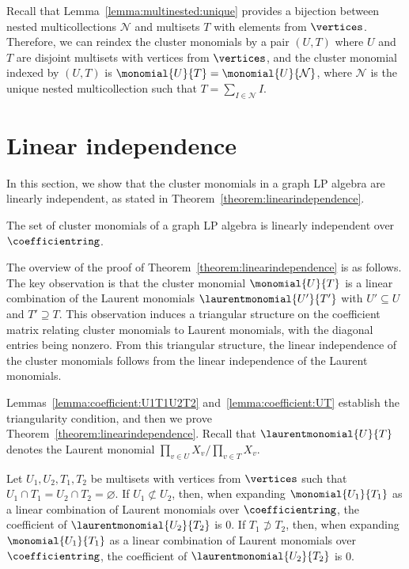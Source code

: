 Recall that Lemma~\ref{lemma:multinested:unique} provides a bijection between nested multicollections \(\mathcal{N}\) and multisets \(T\) with elements from \(\vertices\).
Therefore, we can reindex the cluster monomials by a pair \((U, T)\) where \(U\) and \(T\) are disjoint multisets with vertices from \(\vertices\),
and the cluster monomial indexed by \((U, T)\) is 
\( \monomial{U}{T} = \monomial{U}{\mathcal{N}} \),
where \(\mathcal{N}\) is the unique nested multicollection such that \(T = \sum_{I \in \mathcal{N}} I\).

\section{Linear independence} \label{section:linearindependence}

In this section, we show that the cluster monomials in a graph LP algebra are linearly independent, as stated in Theorem~\ref{theorem:linearindependence}.

\begin{theo} \label{theorem:linearindependence}
    The set of cluster monomials of a graph LP algebra is linearly independent over \(\coefficientring\).
\end{theo}

The overview of the proof of Theorem~\ref{theorem:linearindependence} is as follows.
The key observation is that the cluster monomial \(\monomial{U}{T}\) is a linear combination of the Laurent monomials \( \laurentmonomial{U'}{T'} \) with \(U' \subseteq U\) and \(T' \supseteq T\).
This observation induces a triangular structure on the coefficient matrix relating cluster monomials to Laurent monomials, with the diagonal entries being nonzero.
From this triangular structure, the linear independence of the cluster monomials follows from the linear independence of the Laurent monomials.

Lemmas~\ref{lemma:coefficient:U1T1U2T2} and~\ref{lemma:coefficient:UT} establish the triangularity condition,
and then we prove Theorem~\ref{theorem:linearindependence}.
Recall that \(\laurentmonomial{U}{T}\) denotes the Laurent monomial \({\prod_{v \in U} X_v} \big/ {\prod_{v \in T}X_v}\). 

\begin{lemm} \label{lemma:coefficient:U1T1U2T2}
    Let \(U_1, U_2, T_1, T_2\) be multisets with vertices from \(\vertices\)
    such that \(U_1 \cap T_1 = U_2 \cap T_2 = \varnothing\).
    If \(U_1 \not\subset U_2\), then, when expanding \(\monomial{U_1}{T_1}\) as a linear combination of Laurent monomials over \(\coefficientring\), the coefficient of \(\laurentmonomial{U_2}{T_2}\) is \(0\).
    If \(T_1 \not\supset T_2\), then, when expanding \(\monomial{U_1}{T_1}\) as a linear combination of Laurent monomials over \(\coefficientring\), the coefficient of \(\laurentmonomial{U_2}{T_2}\) is \(0\).
\end{lemm}


